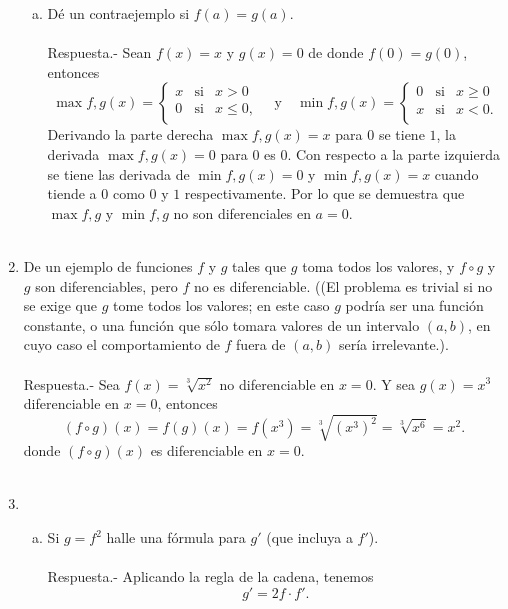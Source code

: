 \begin{enumerate}[\bfseries 1.]
\begin{enumerate}[(a)]
	     \item Dé un contraejemplo si $f(a)=g(a)$.\\\\
		 Respuesta.-\; Sean $f(x)=x$ y $g(x)=0$ de donde $f(0)=g(0)$, entonces
		 $$\max{f,g}(x)=\left\{\begin{array}{rcl}
			 x & \mbox{si} & x>0\\
			 0 & \mbox{si} & x\leq 0,\\
		 \end{array}\right. \quad \mbox{y}\quad 
		    \min{f,g}(x)=\left\{\begin{array}{rcl}
			 0 & \mbox{si} & x\geq 0\\
			 x & \mbox{si} & x< 0.\\
		    \end{array}\right.
		 $$
		 Derivando la parte derecha $\max{f,g}(x)=x$ para $0$ se tiene $1$, la derivada $\max{f,g}(x)=0$ para $0$ es $0$. Con respecto a la parte izquierda se tiene las derivada de $\min{f,g}(x)=0$ y $\min{f,g}(x)=x$ cuando tiende a $0$ como $0$ y $1$ respectivamente. Por lo que se demuestra que $\max{f,g}$ y $\min{f,g}$ no son diferenciales en $a=0$.\\\\

	 \end{enumerate}

     \item De un ejemplo de funciones $f$ y $g$ tales que $g$ toma todos los valores, y $f\circ g$ y $g$ son diferenciables, pero $f$ no es diferenciable. ((El problema es trivial si no se exige que $g$ tome todos los valores; en este caso $g$ podría ser una función constante, o una función que sólo tomara valores de un intervalo $(a,b)$, en cuyo caso el comportamiento de $f$ fuera de $(a,b)$ sería irrelevante.).\\\\
	 Respuesta.-\; Sea $f(x)=\sqrt[3]{x^2}$ no diferenciable en $x=0$. Y sea $g(x)=x^3$ diferenciable en $x=0$, entonces
	 $$(f\circ g)(x)=f(g)(x)=f\left(x^3\right)= \sqrt[3]{\left(x^3\right)^2} = \sqrt[3]{x^6}=x^2.$$
	     donde $(f\circ g)(x)$ es diferenciable en $x=0.$\\\\

     \item 
	 \begin{enumerate}[(a)]

	     \item Si $g=f^2$ halle una fórmula para $g'$ (que incluya a $f'$).\\\\
		 Respuesta.- Aplicando la regla de la cadena, tenemos
		 $$g'=2f\cdot f'.$$\\


\end{enumerate}
\end{enumerate}
